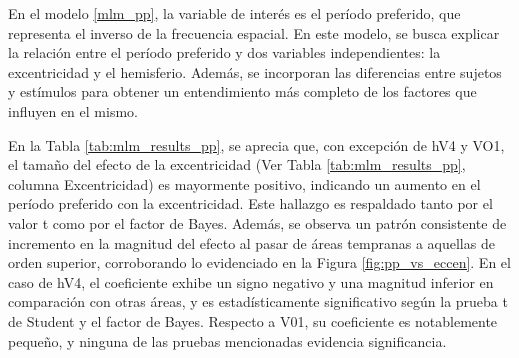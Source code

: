 
En el modelo \ref{mlm_pp}, la variable de interés es el per\'iodo preferido, que representa el inverso de la frecuencia espacial. En este modelo, se busca explicar la relación entre el per\'iodo preferido y dos variables independientes: la excentricidad y el hemisferio. Además, se incorporan las diferencias entre sujetos y estímulos para obtener un entendimiento más completo de los factores que influyen en el mismo.

En la Tabla \ref{tab:mlm_results_pp}, se aprecia que, con excepción de hV4 y VO1, el tamaño del efecto de la excentricidad (Ver Tabla \ref{tab:mlm_results_pp}, columna Excentricidad) es mayormente positivo, indicando un aumento en el per\'iodo preferido con la excentricidad. Este hallazgo es respaldado tanto por el valor t como por el factor de Bayes. Además, se observa un patrón consistente de incremento en la magnitud del efecto al pasar de áreas tempranas a aquellas de orden superior, corroborando lo evidenciado en la Figura \ref{fig:pp_vs_eccen}. En el caso de hV4, el coeficiente exhibe un signo negativo y una magnitud inferior en comparación con otras áreas, y es estadísticamente significativo según la prueba t de Student y  el factor de Bayes. Respecto a V01, su coeficiente es notablemente pequeño, y ninguna de las pruebas mencionadas evidencia significancia.

